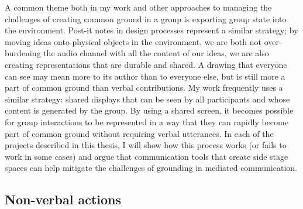 A common theme both in my work and other approaches to managing the challenges of creating common ground in a group is exporting group state into the environment. Post-it notes in design processes represent a similar strategy; by moving ideas onto physical objects in the environment, we are both not over-burdening the audio channel with all the content of our ideas, we are also creating representations that are durable and shared. A drawing that everyone can see may mean more to its author than to everyone else, but is still more a part of common ground than verbal contributions. My work frequently uses a similar strategy: shared displays that can be seen by all participants and whose content is generated by the group. By using a shared screen, it becomes possible for group interactions to be represented in a way that they can rapidly become part of common ground without requiring verbal utterances. In each of the projects described in this thesis, I will show how this process works (or fails to work in some cases) and argue that communication tools that create side stage spaces can help mitigate the challenges of grounding in mediated communication.











\subsection{Non-verbal actions}

